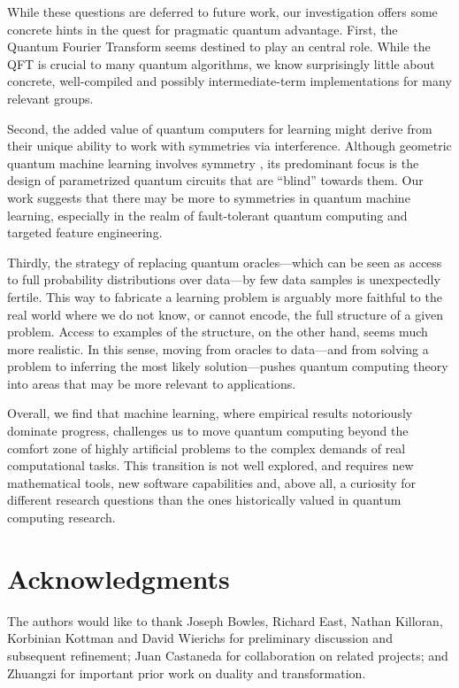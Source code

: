 \documentclass[aps, pre,reprint,nofootinbib,citeautoscript,floatfix]{revtex4-1}
\begin{document}
While these questions are deferred to future work, our investigation offers some concrete hints in the quest for pragmatic quantum advantage. First, the 
Quantum Fourier Transform seems destined to play an central role. While the QFT is crucial to many quantum algorithms, we know surprisingly little about concrete, well-compiled and possibly intermediate-term implementations for many relevant groups.

Second, the added value of quantum computers for learning might derive from their unique ability to work with symmetries via interference. Although geometric quantum machine learning involves symmetry \cite{Meyer_2023, Larocca_2022}, its predominant focus is the design of parametrized quantum circuits that are ``blind'' towards them. Our work suggests that there may be more to symmetries in quantum machine learning, especially in the realm of fault-tolerant quantum computing and targeted feature engineering. 

Thirdly, the strategy of replacing quantum oracles---which can be seen as access to full probability distributions over data---by few data samples is unexpectedly fertile.  
This way to fabricate a learning problem is arguably more faithful to the real world where we do not know, or cannot encode, the full structure of a given problem.
Access to examples of the structure, on the other hand, seems much more realistic. In this sense, moving from oracles to data---and from solving a problem to inferring the most likely solution---pushes quantum computing theory into areas that may be more relevant to applications. 

Overall, we find that machine learning, where empirical results notoriously dominate progress, challenges us to move quantum computing beyond the comfort zone of highly artificial problems to the complex demands of real computational tasks. This transition is not well explored, and requires new mathematical tools, new software capabilities and, above all, a curiosity for different research questions than the ones historically valued in quantum computing research.


\section*{Acknowledgments}
\label{sec:acknowledgments}

The authors would like to thank Joseph Bowles, Richard East, Nathan
Killoran, Korbinian
Kottman and David Wierichs for preliminary discussion and
subsequent refinement; Juan Castaneda for collaboration on
related projects; and Zhuangzi for important prior work on duality and
transformation.
\end{document}
